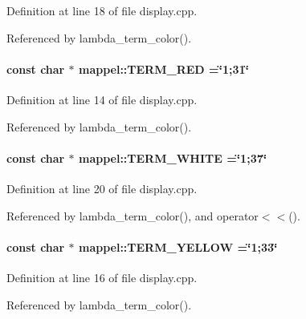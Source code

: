 Definition at line 18 of file display.\+cpp.



Referenced by lambda\+\_\+term\+\_\+color().

\paragraph[{\texorpdfstring{T\+E\+R\+M\+\_\+\+R\+ED}{TERM_RED}}]{\setlength{\rightskip}{0pt plus 5cm}const char $\ast$ mappel\+::\+T\+E\+R\+M\+\_\+\+R\+ED =\char`\"{}1;31\char`\"{}}\hypertarget{namespacemappel_ab22998f4999661d300fe1f1e2bc615a2}{}\label{namespacemappel_ab22998f4999661d300fe1f1e2bc615a2}


Definition at line 14 of file display.\+cpp.



Referenced by lambda\+\_\+term\+\_\+color().

\paragraph[{\texorpdfstring{T\+E\+R\+M\+\_\+\+W\+H\+I\+TE}{TERM_WHITE}}]{\setlength{\rightskip}{0pt plus 5cm}const char $\ast$ mappel\+::\+T\+E\+R\+M\+\_\+\+W\+H\+I\+TE =\char`\"{}1;37\char`\"{}}\hypertarget{namespacemappel_aa0d4a391df8c98076fb8d02fe34ce24c}{}\label{namespacemappel_aa0d4a391df8c98076fb8d02fe34ce24c}


Definition at line 20 of file display.\+cpp.



Referenced by lambda\+\_\+term\+\_\+color(), and operator$<$$<$().

\paragraph[{\texorpdfstring{T\+E\+R\+M\+\_\+\+Y\+E\+L\+L\+OW}{TERM_YELLOW}}]{\setlength{\rightskip}{0pt plus 5cm}const char $\ast$ mappel\+::\+T\+E\+R\+M\+\_\+\+Y\+E\+L\+L\+OW =\char`\"{}1;33\char`\"{}}\hypertarget{namespacemappel_ae85ff1ec27541515a29ca8b7301866dd}{}\label{namespacemappel_ae85ff1ec27541515a29ca8b7301866dd}


Definition at line 16 of file display.\+cpp.



Referenced by lambda\+\_\+term\+\_\+color().

